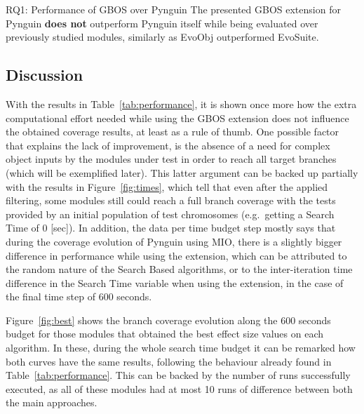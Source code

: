 \documentclass[%
  chapterprefix=false,%
  open=right,%
  twoside=true,%
  paper=a4,%
  logofile={Figures/logo.png},%
  thesistype=master,%
  UKenglish,%
]{se2thesis}
\begin{document}
\begin{table}[t]
  \centering
  
\caption{Amount of modules used while analysing each experimental configuration  for the answering of Research Question 1.}\label{tab:modrq1}
\end{table}


\begin{summary}{RQ1: Performance of GBOS over Pynguin}
  The presented GBOS extension for Pynguin \textbf{does not} outperform Pynguin itself while being evaluated over previously studied modules, similarly as EvoObj outperformed EvoSuite. 
\end{summary}

\newpage

\subsection*{Discussion}

With the results in Table~\ref{tab:performance}, it is shown once more how the extra computational effort needed while using the GBOS extension does not influence the obtained coverage results, at least as a rule of thumb.
One possible factor that explains the lack of improvement, is the absence of a need for complex object inputs by the modules under test in order to reach all target branches (which will be exemplified later).
This latter argument can be backed up partially with the results in Figure~\ref{fig:times}, which tell that even after the applied filtering, some modules still could reach a full branch coverage with the tests provided by an initial population of test chromosomes (e.g.~getting a Search Time of 0 [sec]).
In addition, the data per time budget step mostly says that during the coverage evolution of Pynguin using MIO, there is a slightly bigger difference in performance while using the extension, which can be attributed to the random nature of the Search Based algorithms, or to the inter-iteration time difference in the Search Time variable when using the extension, in the case of the final time step of 600 seconds.

Figure~\ref{fig:best} shows the branch coverage evolution along the 600 seconds budget for those modules that obtained the best effect size values on each algorithm.
In these, during the whole search time budget it can be remarked how both curves have the same results, following the behaviour already found in Table~\ref{tab:performance}.
This can be backed by the number of runs successfully executed, as all of these modules had at most 10 runs of difference between both the main approaches.
\end{document}

